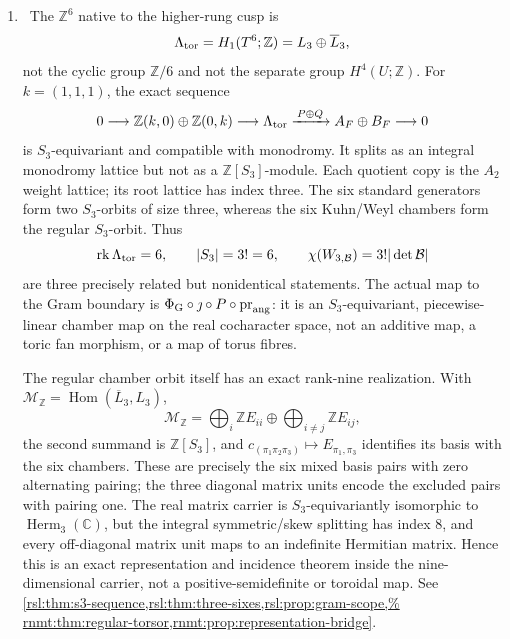 \begin{enumerate}[leftmargin=1.8em]
\item \Verified\ The \(\mathbb Z^6\) native to the higher-rung cusp is
\[
 \Lambda_{\rm tor}=H_1(T^6;\mathbb Z)
 =L_3\oplus\overline L_3,
\]
not the cyclic group \(\mathbb Z/6\) and not the separate group
\(H^4(U;\mathbb Z)\).  For \(k=(1,1,1)\), the exact sequence
\[
 0\longrightarrow \mathbb Z(k,0)\oplus\mathbb Z(0,k)
 \longrightarrow\Lambda_{\rm tor}
 \xrightarrow{\,P\oplus Q\,}A_F\oplus B_F\longrightarrow0
\]
is \(S_3\)-equivariant and compatible with monodromy.  It splits as an
integral monodromy lattice but not as a \(\mathbb Z[S_3]\)-module.  Each
quotient copy is the \(A_2\) weight lattice; its root lattice has index three.
The six standard generators form two \(S_3\)-orbits of size three, whereas
the six Kuhn/Weyl chambers form the regular \(S_3\)-orbit.  Thus
\[
 \operatorname{rk}\Lambda_{\rm tor}=6,\qquad |S_3|=3!=6,
 \qquad\chi(W_{3,\mathcal B})=3!|\det\mathcal B|
\]
are three precisely related but nonidentical statements.  The actual map to
the Gram boundary is
\(\Phi_{\rm G}\circ\jmath\circ P\circ\operatorname{pr}_{\rm ang}\): it is
an \(S_3\)-equivariant, piecewise-linear chamber map on the real
cocharacter space, not an additive map, a toric fan morphism, or a map of
torus fibres.

The regular chamber orbit itself has an exact rank-nine realization.  With
\(\mathcal M_{\mathbb Z}=\operatorname{Hom}(\overline L_3,L_3)\),
\[
 \mathcal M_{\mathbb Z}
 =\bigoplus_i\mathbb ZE_{ii}\oplus
  \bigoplus_{i\ne j}\mathbb ZE_{ij},
\]
the second summand is \(\mathbb Z[S_3]\), and
\(c_{(\pi_1\pi_2\pi_3)}\mapsto E_{\pi_1,\pi_3}\) identifies its basis
with the six chambers.  These are precisely the six mixed basis pairs with
zero alternating pairing; the three diagonal matrix units encode the
excluded pairs with pairing one.  The real matrix carrier is
\(S_3\)-equivariantly isomorphic to \(\operatorname{Herm}_3(\mathbb C)\),
but the integral symmetric/skew splitting has index \(8\), and every
off-diagonal matrix unit maps to an indefinite Hermitian matrix.  Hence this
is an exact representation and incidence theorem inside the
nine-dimensional carrier, not a positive-semidefinite or toroidal map.  See
\cref{rsl:thm:s3-sequence,rsl:thm:three-sixes,rsl:prop:gram-scope,%
rnmt:thm:regular-torsor,rnmt:prop:representation-bridge}.


\end{enumerate}
